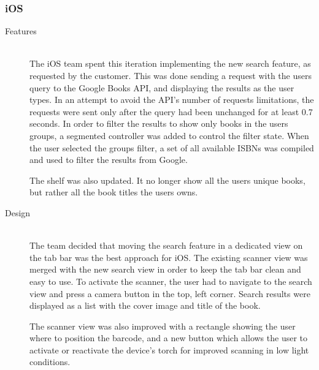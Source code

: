 \subsubsection{iOS}
\begin{description}
    \item[Features] \hfill\\
The iOS team spent this iteration implementing the new search feature, as requested by the customer. This was done sending a request with the users query to the Google Books API, and displaying the results as the user types. In an attempt to avoid the API's number of requests limitations, the requests were sent only after the query had been unchanged for at least 0.7 seconds. In order to filter the results to show only books in the users groups, a segmented controller was added to control the filter state. When the user selected the groups filter, a set of all available \gls{ISBN}s was compiled and used to filter the results from Google.

The shelf was also updated. It no longer show all the users unique books, but rather all the book titles the users owns. 

    \item[Design] \hfill\\
The team decided that moving the search feature in a dedicated view on the tab bar was the best approach for iOS. The existing scanner view was merged with the new search view in order to keep the tab bar clean and easy to use. To activate the scanner, the user had to navigate to the search view and press a camera button in the top, left corner. Search results were displayed as a list with the cover image and title of the book.

The scanner view was also improved with a rectangle showing the user where to position the barcode, and a new button which allows the user to activate or reactivate the device's torch for improved scanning in low light conditions.


\end{description}
